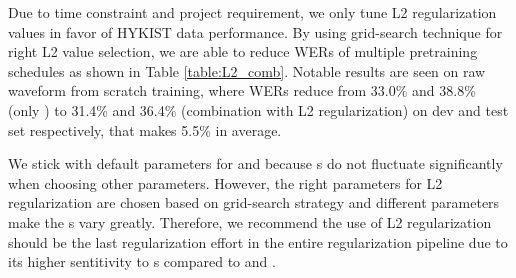 

Due to time constraint and project requirement, we only tune L2 regularization values in favor of HYKIST data performance.
By using grid-search technique for right L2 value selection, we are able to reduce \glspl{WER} of multiple pretraining schedules as shown in Table \ref{table:L2_comb}.
Notable results are seen on raw waveform from scratch training, where \glspl{WER} reduce from 33.0\% and 38.8\% (only ) to 31.4\% and 36.4\% (combination with L2 regularization) on dev and test set respectively, that makes  5.5\% in average.

We stick with default parameters for  and  because s do not fluctuate significantly when choosing other parameters.
However, the right parameters for L2 regularization are chosen based on grid-search strategy and different parameters make the s vary greatly.
Therefore, we recommend the use of L2 regularization should be the last regularization effort in the entire regularization pipeline due to its higher sentitivity to s compared to  and . 

